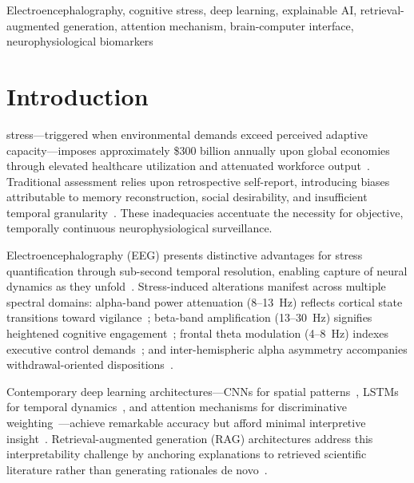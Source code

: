 \documentclass[journal,twoside]{IEEEtran}
\begin{document}
\begin{IEEEkeywords}
Electroencephalography, cognitive stress, deep learning, explainable AI, retrieval-augmented generation, attention mechanism, brain-computer interface, neurophysiological biomarkers
\end{IEEEkeywords}

\section{Introduction}

 stress---triggered when environmental demands exceed perceived adaptive capacity---imposes approximately \$300 billion annually upon global economies through elevated healthcare utilization and attenuated workforce output~\cite{lazarus1984stress,who2023mental}. Traditional assessment relies upon retrospective self-report, introducing biases attributable to memory reconstruction, social desirability, and insufficient temporal granularity~\cite{cohen1983global}. These inadequacies accentuate the necessity for objective, temporally continuous neurophysiological surveillance.

Electroencephalography (EEG) presents distinctive advantages for stress quantification through sub-second temporal resolution, enabling capture of neural dynamics as they unfold~\cite{niedermeyer2005electroencephalography}. Stress-induced alterations manifest across multiple spectral domains: alpha-band power attenuation (8--13~Hz) reflects cortical state transitions toward vigilance~\cite{klimesch1999alpha}; beta-band amplification (13--30~Hz) signifies heightened cognitive engagement~\cite{engel2001dynamic}; frontal theta modulation (4--8~Hz) indexes executive control demands~\cite{cavanagh2014frontal}; and inter-hemispheric alpha asymmetry accompanies withdrawal-oriented dispositions~\cite{davidson2004well}.

Contemporary deep learning architectures---CNNs for spatial patterns~\cite{schirrmeister2017deep}, LSTMs for temporal dynamics~\cite{bashivan2016learning}, and attention mechanisms for discriminative weighting~\cite{zhang2019making}---achieve remarkable accuracy but afford minimal interpretive insight~\cite{tonekaboni2019clinicians}. Retrieval-augmented generation (RAG) architectures address this interpretability challenge by anchoring explanations to retrieved scientific literature rather than generating rationales de novo~\cite{lewis2020retrieval,jin2024health}.
\end{document}
